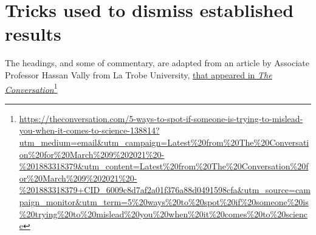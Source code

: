 \documentclass[
  10pt,
  b5paper]{book}
\begin{document}
\hypertarget{tricks-used-to-dismiss-established-results}{%
\section{Tricks used to dismiss established results}\label{tricks-used-to-dismiss-established-results}}

The headings, and some of commentary, are adapted from an article by
Associate Professor Hassan Vally from La Trobe University,
\href{https://theconversation.com/5-ways-to-spot-if-someone-is-trying-to-mislead-you-when-it-comes-to-science-138814?utm_medium=email\&utm_campaign=Latest\%20from\%20The\%20Conversation\%20for\%20March\%209\%202021\%20-\%201883318379\&utm_content=Latest\%20from\%20The\%20Conversation\%20for\%20March\%209\%202021\%20-\%201883318379+CID_6009c8d7af2a01f376a88d0491598cfa\&utm_source=campaign_monitor\&utm_term=5\%20ways\%20to\%20spot\%20if\%20someone\%20is\%20trying\%20to\%20mislead\%20you\%20when\%20it\%20comes\%20to\%20science}{that appeared in \emph{The Conversation}}\footnote{\url{https://theconversation.com/5-ways-to-spot-if-someone-is-trying-to-mislead-you-when-it-comes-to-science-138814?utm_medium=email\&utm_campaign=Latest\%20from\%20The\%20Conversation\%20for\%20March\%209\%202021\%20-\%201883318379\&utm_content=Latest\%20from\%20The\%20Conversation\%20for\%20March\%209\%202021\%20-\%201883318379+CID_6009c8d7af2a01f376a88d0491598cfa\&utm_source=campaign_monitor\&utm_term=5\%20ways\%20to\%20spot\%20if\%20someone\%20is\%20trying\%20to\%20mislead\%20you\%20when\%20it\%20comes\%20to\%20science}}
\end{document}
